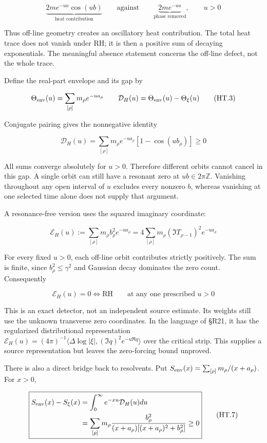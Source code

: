 \documentclass[
  11pt,
]{book}
\begin{document}
\[
\underbrace{2m e^{-ua}\cos(ub)}_{\text{heat contribution}}
\qquad\text{against}\qquad
\underbrace{2m e^{-ua}}_{\text{phase removed}},\qquad u>0
\tag{HT.2}
\]

Thus off-line geometry creates an oscillatory heat contribution. The
total heat trace does not vanish under RH; it is then a positive sum of
decaying exponentials. The meaningful absence statement concerns the
off-line defect, not the whole trace.

Define the real-part envelope and its gap by

\[
\Theta_{\rm env}(u)=\sum_{[\rho]}m_\rho e^{-ua_\rho}
\qquad \mathcal D_H(u)=\Theta_{\rm env}(u)-\Theta_\xi(u)
\tag{HT.3}
\]

Conjugate pairing gives the nonnegative identity

\[
\boxed{\mathcal D_H(u)
=\sum_{[\rho]}m_\rho e^{-ua_\rho}
[1-\cos(ub_\rho)]\ge0}
\tag{HT.4}
\]

All sums converge absolutely for \(u>0\). Therefore different orbits
cannot cancel in this gap. A single orbit can still have a resonant zero
at \(ub\in2\pi\mathbb Z\). Vanishing throughout any open interval of
\(u\) excludes every nonzero \(b\), whereas vanishing at one selected
time alone does not supply that argument.

A resonance-free version uses the squared imaginary coordinate:

\[
\boxed{\mathcal E_H(u):=\sum_{[\rho]}m_\rho b_\rho^2e^{-ua_\rho}
=4\sum_{[\rho]}m_\rho(\Im T_{\rho-1})^2e^{-ua_\rho}}
\tag{HT.5}
\]

For every fixed \(u>0\), each off-line orbit contributes strictly
positively. The sum is finite, since \(b_\rho^2\le\gamma^2\) and
Gaussian decay dominates the zero count. Consequently

\[
\boxed{\mathcal E_H(u)=0\iff\mathrm{RH}\qquad
\text{at any one prescribed }u>0}
\tag{HT.6}
\]

This is an exact detector, not an independent source estimate. Its
weights still use the unknown transverse zero coordinates. In the
language of §R21, it has the regularized distributional representation
\(\mathcal E_H(u)=(4\pi)^{-1}\langle\Delta\log|\xi|,
(\Im q)^2e^{-u\Re q}\rangle\) over the critical strip. This supplies a
source representation but leaves the zero-forcing bound unproved.

There is also a direct bridge back to resolvents. Put
\(S_{\rm env}(x)=\sum_{[\rho]}m_\rho/(x+a_\rho)\). For \(x>0\),

\[
\boxed{\begin{aligned}
S_{\rm env}(x)-S_\xi(x)
&=\int_0^\infty e^{-xu}\mathcal D_H(u)du\\
&=\sum_{[\rho]}m_\rho
\frac{b_\rho^2}{(x+a_\rho)[(x+a_\rho)^2+b_\rho^2]}
\ge0
\end{aligned}}
\tag{HT.7}
\]
\end{document}
